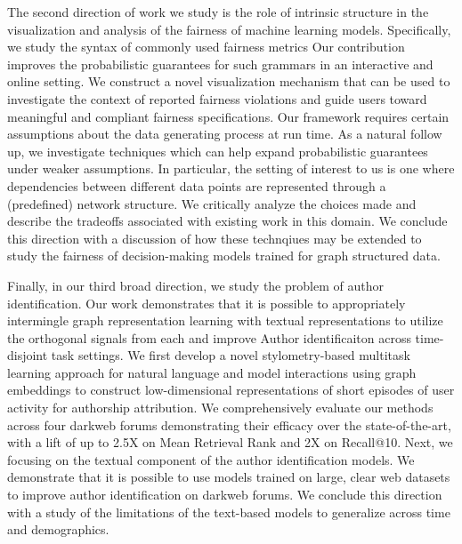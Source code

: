 The second direction of work we study is the role of intrinsic structure in the visualization and analysis of the fairness of machine learning models.
Specifically, we study the syntax of commonly used fairness metrics 
Our contribution improves the probabilistic guarantees for such grammars in an interactive and online setting.
We construct a novel visualization mechanism that can be used to investigate the context of reported fairness violations and guide users toward meaningful and compliant fairness specifications.
Our framework requires certain assumptions about the data generating process at run time.
As a natural follow up, we investigate techniques which can help expand probabilistic guarantees under weaker assumptions.
In particular, the setting of interest to us is one where dependencies between different data points are represented through a (predefined) network structure. We critically analyze the choices made and describe the tradeoffs associated with existing work in this domain.
We conclude this direction with a discussion of how these technqiues may be extended to study the fairness of decision-making models trained for graph structured data.

Finally, in our third broad direction, we study the problem of author identification.
Our work demonstrates that it is possible to appropriately intermingle graph representation learning with textual representations to utilize the orthogonal signals from each and improve Author identificaiton across time-disjoint task settings.
We first develop a novel stylometry-based multitask learning approach for natural language and model interactions using graph embeddings to construct low-dimensional representations of short episodes of user activity for authorship attribution. 
We comprehensively evaluate our methods across four darkweb forums demonstrating their efficacy over the state-of-the-art, with a lift of up to 2.5X on Mean Retrieval Rank and 2X on Recall@10.
Next, we focusing on the textual component of the author identification models.
We demonstrate that it is possible to use models trained on large, clear web datasets to improve author identification on darkweb forums.
We conclude this direction with a study of the limitations of the text-based models to generalize across time and demographics.



